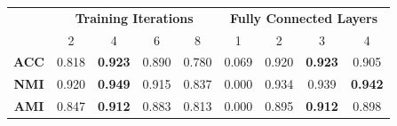 \setlength{\tabcolsep}{3pt}
\begin{tabular}{|c|cccc|cccc|}
\hline
 & \multicolumn{4}{c|}{\textbf{Training Iterations}} & \multicolumn{4}{c|}{\textbf{Fully Connected Layers}} \\
 & 2 & 4 & 6 & 8 & 1 & 2 & 3 & 4\\\hline
 
\textbf{ACC} & 0.818 & \textbf{0.923} & 0.890 & 0.780 & 0.069 & 0.920 & \textbf{0.923} & 0.905\\
\textbf{NMI} & 0.920 & \textbf{0.949} & 0.915 & 0.837 & 0.000 & 0.934 & 0.939 & \textbf{0.942}\\
\textbf{AMI} & 0.847 & \textbf{0.912} & 0.883 & 0.813 & 0.000 & 0.895 & \textbf{0.912} & 0.898\\

\hline
\end{tabular}





